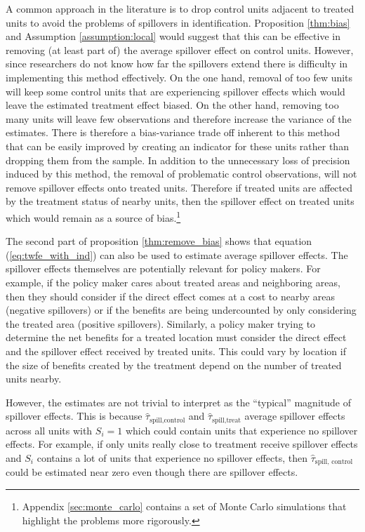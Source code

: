 \documentclass[11pt]{article}
\begin{document}
A common approach in the literature is to drop control units adjacent to treated units to avoid the problems of spillovers in identification. Proposition \ref{thm:bias} and Assumption \ref{assumption:local} would suggest that this can be effective in removing (at least part of) the average spillover effect on control units. However, since researchers do not know how far the spillovers extend there is difficulty in implementing this method effectively. On the one hand, removal of too few units will keep some control units that are experiencing spillover effects which would leave the estimated treatment effect biased. On the other hand, removing too many units will leave few observations and therefore increase the variance of the estimates. There is therefore a bias-variance trade off inherent to this method that can be easily improved by creating an indicator for these units rather than dropping them from the sample. In addition to the unnecessary loss of precision induced by this method, the removal of problematic control observations, will not remove spillover effects onto treated units. Therefore if treated units are affected by the treatment status of nearby units, then the spillover effect on treated units which would remain as a source of bias.\footnote{Appendix \ref{sec:monte_carlo} contains a set of Monte Carlo simulations that highlight the problems more rigorously.}

The second part of proposition \ref{thm:remove_bias} shows that equation (\ref{eq:twfe_with_ind}) can also be used to estimate average spillover effects. The spillover effects themselves are potentially relevant for policy makers. For example, if the policy maker cares about treated areas and neighboring areas, then they should consider if the direct effect comes at a cost to nearby areas (negative spillovers) or if the benefits are being undercounted by only considering the treated area (positive spillovers). Similarly, a policy maker trying to determine the net benefits for a treated location must consider the direct effect and the spillover effect received by treated units. This could vary by location if the size of benefits created by the treatment depend on the number of treated units nearby.

However, the estimates are not trivial to interpret as the ``typical'' magnitude of spillover effects. This is because $\hat{\tau}_{\text{spill,control}}$ and $\hat{\tau}_{\text{spill,treat}}$ average spillover effects across all units with $S_i = 1$ which could contain units that experience no spillover effects. For example, if only units really close to treatment receive spillover effects and $S_i$ contains a lot of units that experience no spillover effects, then $\hat{\tau}_{\text{spill, control}}$ could be estimated near zero even though there are spillover effects. 
\end{document}
